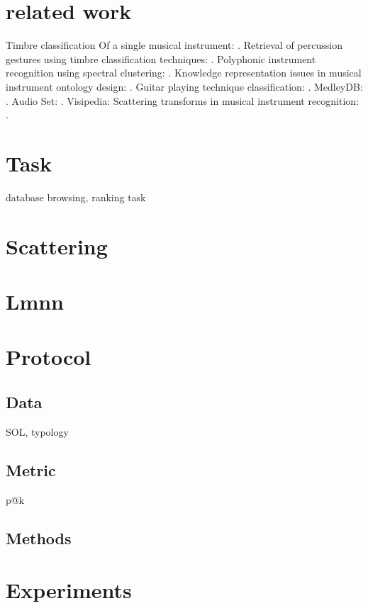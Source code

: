 \documentclass{article}
\begin{document}
\section{related work}
Timbre classification Of a single musical instrument: \cite{loureiro2004ismir}.
Retrieval of percussion gestures using timbre classification techniques: \cite{tindale2004ismir}.
Polyphonic instrument recognition using spectral clustering: \cite{martins2007ismir}.
Knowledge representation issues in musical instrument ontology design: \cite{kolozali2011ismir}.
Guitar playing technique classification: \cite{su2014ismir}.
MedleyDB: \cite{bittner2014ismir}.
Audio Set: \cite{gemmeke2017icassp}.
Visipedia: \cite{belongie2015pattern}
Scattering transforms in musical instrument recognition: \cite{tjoa2010ismir,lostanlen2017phd}.



\section{Task}

database browsing, ranking task

\section{Scattering}

\section{Lmnn}

\section{Protocol}

\subsection{Data}

SOL, typology

\subsection{Metric}

p@k

\subsection{Methods}


\section{Experiments}










\end{document}
